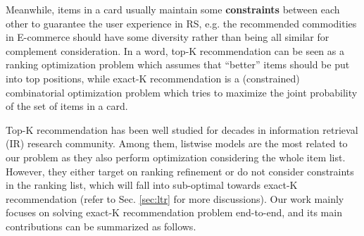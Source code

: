 Meanwhile, items in a card usually maintain some \textbf{constraints} between each other to guarantee the user experience in RS,
e.g. the recommended commodities in E-commerce should have some diversity rather than being all similar for complement consideration.
In a word, top-K recommendation can be seen as a ranking optimization problem which assumes that ``better'' items should be put into top positions,
while exact-K recommendation is a (constrained) combinatorial optimization problem
which tries to maximize the joint probability of the set of items in a card.

Top-K recommendation has been well studied for decades in information retrieval (IR) research community. Among them, listwise models are the most related to our problem as they also perform optimization considering the whole item list. However, they either target on ranking refinement or do not consider constraints in the ranking list, which will fall into sub-optimal towards exact-K recommendation (refer to Sec. \ref{sec:ltr} for more discussions). Our work mainly focuses on solving exact-K recommendation problem end-to-end, and its main contributions can be summarized as follows.
